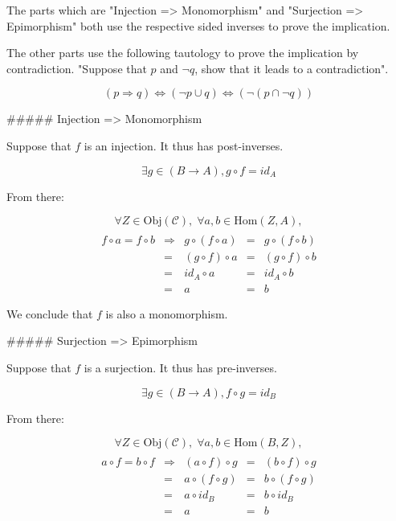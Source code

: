 The parts which are "Injection => Monomorphism" and "Surjection => Epimorphism" both use the respective sided inverses to prove the implication.

The other parts use the following tautology to prove the implication by contradiction. "Suppose that $p$ and $\neg q$, show that it leads to a contradiction".

$$
(p \Rightarrow q) \Leftrightarrow
(\neg p \cup q)  \Leftrightarrow
(\neg (p \cap \neg q))
$$

##### Injection => Monomorphism

Suppose that $f$ is an injection. It thus has post-inverses.

$$\exists g \in (B \to A), g \circ f = id_A$$

From there:

$$
\forall Z \in \text{Obj}(\mathcal{C}), \;
\forall a, b \in \text{Hom}(Z, A),
$$
$$
\begin{array}{ccccc} \\
f \circ a = f \circ b & \Rightarrow &  g \circ (f  \circ a) &=&  g \circ (f  \circ b) \\
                      & =           & (g \circ  f) \circ a  &=& (g \circ  f) \circ b  \\
                      & =           &         id_A \circ a  &=&         id_A \circ b  \\
                      & =           &                    a  &=&                    b
\end{array}
$$

We conclude that $f$ is also a monomorphism.


##### Surjection => Epimorphism

Suppose that $f$ is a surjection. It thus has pre-inverses.

$$\exists g \in (B \to A), f \circ g = id_B$$

From there:

$$
\forall Z \in \text{Obj}(\mathcal{C}), \;
\forall a, b \in \text{Hom}(B, Z),
$$
$$
\begin{array}{ccccc} \\
a \circ f = b \circ f & \Rightarrow & (a \circ  f) \circ g  &=& (b \circ  f) \circ g  \\
                      & =           &  a \circ (f  \circ g) &=&  b \circ (f  \circ g) \\
                      & =           &  a \circ  id_B        &=&  b \circ  id_B        \\
                      & =           &  a                    &=&  b
\end{array}
$$

